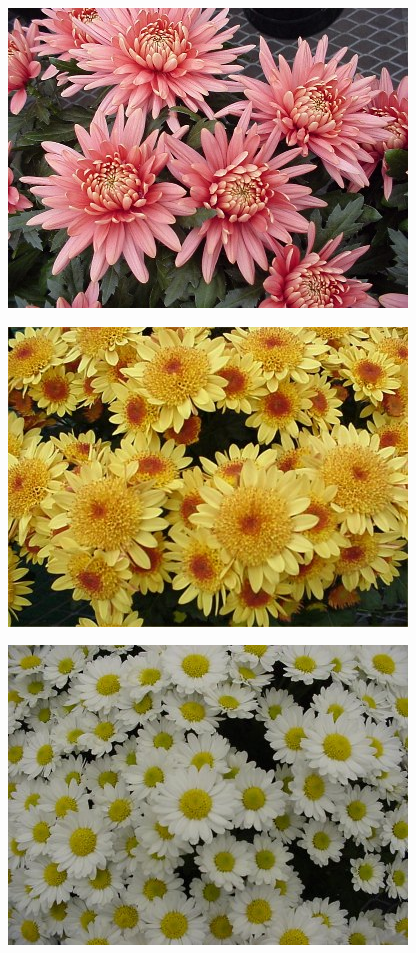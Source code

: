 \documentclass{article}
\begin{document}
\begin{center}
\includegraphics[height=0.925\paperheight]{../Chrysanthemum_SalmonSpringfield.jpg}
\end{center}
\newpage

\begin{center}
\includegraphics[height=0.925\paperheight]{../Chrysanthemum_SunFire.jpg}
\end{center}
\newpage

\begin{center}
\includegraphics[height=0.925\paperheight]{../Chrysanthemum_Sylvie.jpg}
\end{center}
\newpage
\end{document}
